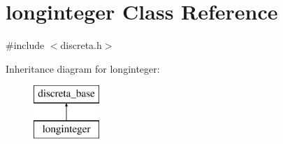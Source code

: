 \hypertarget{classlonginteger}{}\section{longinteger Class Reference}
\label{classlonginteger}


{\ttfamily \#include $<$discreta.\+h$>$}

Inheritance diagram for longinteger\+:\begin{figure}[H]
\begin{center}
\leavevmode
\includegraphics[height=2.000000cm]{classlonginteger}
\end{center}
\end{figure}
